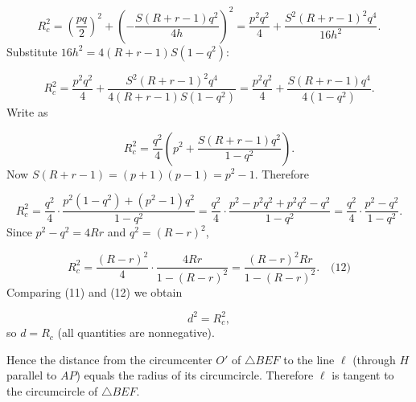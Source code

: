 \[
R_c^2 = \left(\frac{p q}{2}\right)^2 + \left(-\frac{ S (R+r-1) q^2}{4h}\right)^2
= \frac{p^2 q^2}{4} + \frac{ S^2 (R+r-1)^2 q^4}{16 h^2}.
\]
Substitute \(16 h^2 = 4 (R+r-1) S (1 - q^2)\):\par
\[
R_c^2 = \frac{p^2 q^2}{4} + \frac{ S^2 (R+r-1)^2 q^4}{4 (R+r-1) S (1 - q^2)}
= \frac{p^2 q^2}{4} + \frac{ S (R+r-1) q^4}{4 (1 - q^2)}.
\]
Write as\par
\[
R_c^2 = \frac{q^2}{4}\left( p^2 + \frac{ S (R+r-1) q^2}{1 - q^2} \right).
\]
Now \(S (R+r-1) = (p+1)(p-1) = p^2 - 1.\) Therefore\par
\[
R_c^2 = \frac{q^2}{4} \cdot \frac{ p^2(1 - q^2) + (p^2 - 1) q^2}{1 - q^2}
= \frac{q^2}{4} \cdot \frac{ p^2 - p^2 q^2 + p^2 q^2 - q^2}{1 - q^2}
= \frac{q^2}{4} \cdot \frac{ p^2 - q^2}{1 - q^2}.
\]
Since \(p^2 - q^2 = 4R r\) and \(q^2 = (R - r)^2\),\par
\[
R_c^2 = \frac{ (R - r)^2}{4} \cdot \frac{4R r}{1 - (R - r)^2}
= \frac{ (R - r)^2 R r}{1 - (R - r)^2}. \quad\text{(12)}
\]
Comparing (11) and (12) we obtain\par
\[
d^2 = R_c^2,
\]
so \(d = R_c\) (all quantities are nonnegative).\par
Hence the distance from the circumcenter \(O'\) of \(\triangle BEF\) to the line \(\ell\) (through \(H\) parallel to \(AP\)) equals the radius of its circumcircle. Therefore \(\ell\) is tangent to the circumcircle of \(\triangle BEF\).\par
\par
